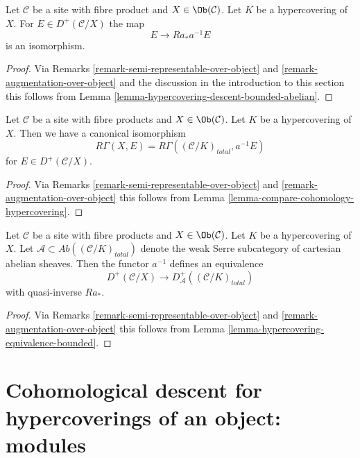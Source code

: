 \begin{lemma}
\label{lemma-hypercovering-X-descent-bounded-abelian}
Let $\mathcal{C}$ be a site with fibre product and $X \in \Ob(\mathcal{C})$.
Let $K$ be a hypercovering of $X$. For
$E \in D^+(\mathcal{C}/X)$ the map
$$
E \longrightarrow Ra_*a^{-1}E
$$
is an isomorphism.
\end{lemma}

\begin{proof}
Via Remarks \ref{remark-semi-representable-over-object} and
\ref{remark-augmentation-over-object} and the discussion in
the introduction to this section
this follows from Lemma \ref{lemma-hypercovering-descent-bounded-abelian}.
\end{proof}

\begin{lemma}
\label{lemma-compare-cohomology-hypercovering-X}
Let $\mathcal{C}$ be a site with fibre products and $X \in \Ob(\mathcal{C})$.
Let $K$ be a hypercovering of $X$.
Then we have a canonical isomorphism
$$
R\Gamma(X, E) = R\Gamma((\mathcal{C}/K)_{total}, a^{-1}E)
$$
for $E \in D^+(\mathcal{C}/X)$.
\end{lemma}

\begin{proof}
Via Remarks \ref{remark-semi-representable-over-object} and
\ref{remark-augmentation-over-object}
this follows from Lemma \ref{lemma-compare-cohomology-hypercovering}.
\end{proof}

\begin{lemma}
\label{lemma-hypercovering-X-equivalence-bounded}
Let $\mathcal{C}$ be a site with fibre products and $X \in \Ob(\mathcal{C})$.
Let $K$ be a hypercovering of $X$.
Let $\mathcal{A} \subset \textit{Ab}((\mathcal{C}/K)_{total})$
denote the weak Serre subcategory of cartesian abelian sheaves.
Then the functor $a^{-1}$ defines an equivalence
$$
D^+(\mathcal{C}/X) \longrightarrow D_\mathcal{A}^+((\mathcal{C}/K)_{total})
$$
with quasi-inverse $Ra_*$.
\end{lemma}

\begin{proof}
Via Remarks \ref{remark-semi-representable-over-object} and
\ref{remark-augmentation-over-object}
this follows from Lemma \ref{lemma-hypercovering-equivalence-bounded}.
\end{proof}








\section{Cohomological descent for hypercoverings of an object: modules}
\label{section-cohomological-descent-hypercoverings-X-modules}

